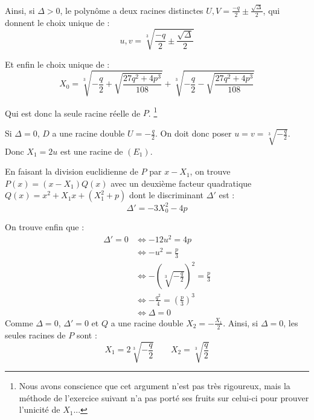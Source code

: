 \documentclass[]{../templates/homework}
\begin{document}
Ainsi, si $\Delta > 0$, le polynôme a deux racines distinctes $U,V = \frac {-q}{2} \pm \frac {\sqrt \Delta} {2}$, qui donnent le choix unique de :
$$u,v = \sqrt[3]{\frac {-q}{2} \pm \frac {\sqrt \Delta} {2}}$$

Et enfin le choix unique de :
$$X_0 = \sqrt[3]{-\frac {q}{2} + \sqrt {\frac {27q^2 + 4p^3}{108}} } + \sqrt[3]{-\frac {q}{2} - \sqrt {\frac {27q^2 + 4p^3}{108}} }$$

Qui est donc la seule racine réelle de $P$. \footnote{Nous avons conscience que cet argument n'est pas très rigoureux, mais la méthode de l'exercice suivant n'a pas porté ses fruits sur celui-ci pour prouver l'unicité de $X_1$...}

\subproblem Si $\Delta = 0$, $D$ a une racine double $U = -\frac q {2}$. On doit donc poser $u = v = \sqrt[3]{-\frac q 2}$. Donc $X_1 = 2u$ est une racine de $(E_1)$.


En faisant la division euclidienne de $P$ par $x-X_1$, on trouve $P(x) = (x-X_1)Q(x)$ avec un deuxième facteur quadratique $Q(x) = x^2 + X_1x + (X_1^2 + p)$ dont le discriminant $\Delta'$ est :
$$\Delta' = -3X_0^2 - 4p$$

On trouve enfin que :
\begin{align*}
	\Delta' = 0 &\iff -12u^2 = 4p \\
	&\iff -u^2 = \frac p 3\\
	&\iff -(\sqrt[3]{-\frac q 2})^2 = \frac p3\\
	&\iff -\frac {q^2} 4 = (\frac p 3)^3\\
	&\iff \Delta = 0
\end{align*}
Comme $\Delta = 0$, $\Delta' = 0$ et $Q$ a une racine double $X_2 = -\frac {X_1} 2$.
Ainsi, si $\Delta = 0$, les seules racines de $P$ sont :
\begin{equation*}
	X_1 = 2\sqrt[3]{-\frac q 2} \qquad X_2 = \sqrt[3]{\frac q 2}
\end{equation*}
\end{document}
